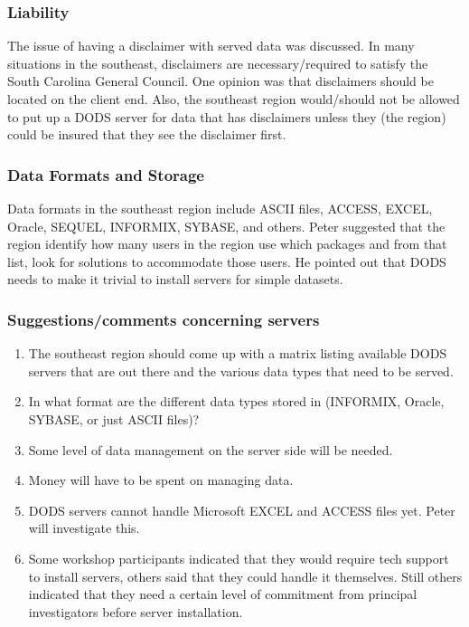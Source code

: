 \subsubsection{Liability}

The issue of having a disclaimer with served data was discussed.  In
many situations in the southeast, disclaimers are necessary/required
to satisfy the South Carolina General Council.  One opinion was that
disclaimers should be located on the client end.  Also, the southeast
region would/should not be allowed to put up a DODS server for data
that has disclaimers unless they (the region) could be insured that
they see the disclaimer first.

\subsubsection{Data Formats and Storage}

Data formats in the southeast region include ASCII files, ACCESS,
EXCEL, Oracle, SEQUEL, INFORMIX, SYBASE, and others.  Peter suggested
that the region identify how many users in the region use which
packages and from that list, look for solutions to accommodate those
users.  He pointed out that DODS needs to make it trivial to install
servers for simple datasets.

\subsubsection{Suggestions/comments concerning servers}

\begin{enumerate}
\item The southeast region should come up with a matrix listing
  available DODS servers that are out there and the various data types
  that need to be served.
\item In what format are the different data types stored in (INFORMIX,
  Oracle, SYBASE, or just ASCII files)?
\item Some level of data management on the server side will be needed.
\item Money will have to be spent on managing data.
\item DODS servers cannot handle Microsoft EXCEL and ACCESS files yet.
  Peter will investigate this.
\item Some workshop participants indicated that they would require
  tech support to install servers, others said that they could handle
  it themselves.  Still others indicated that they need a certain
  level of commitment from principal investigators before server
  installation.
\end{enumerate}

